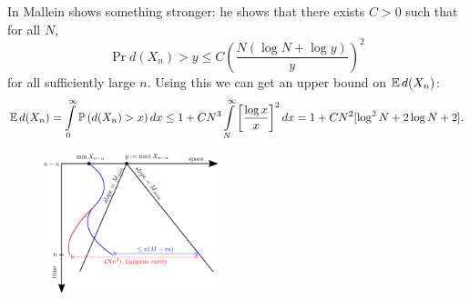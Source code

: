 \begin{remark}
In \cite{mallein2018n} Mallein shows something stronger: he shows that there exists $C > 0$ such that for all $N$, 
\begin{equation}\nonumber
\Pr{d(X_n) > y} \leq C \left( \frac{N(\log N + \log y)}{y}\right)^2
\end{equation}
for all sufficiently large $n$. Using this we can get an upper bound on $\mathbb{E}\, d(X_n)$:
\begin{equation}\nonumber
\mathbb{E}\, d(X_n) = \int\limits_0^\infty \mathbb{P} \left( d(X_n) > x \right) dx \leq 1 + C N^3 \int\limits^\infty_N \left[\frac{\log x}{x}\right]^2 dx = 1 + C N^2[ \log^2 N + 2 \log N + 2]. 
\end{equation}
\end{remark}

\begin{figure}
\centering
\includegraphics[width=0.45\textwidth]{graphics/g2.png}
\end{figure}

